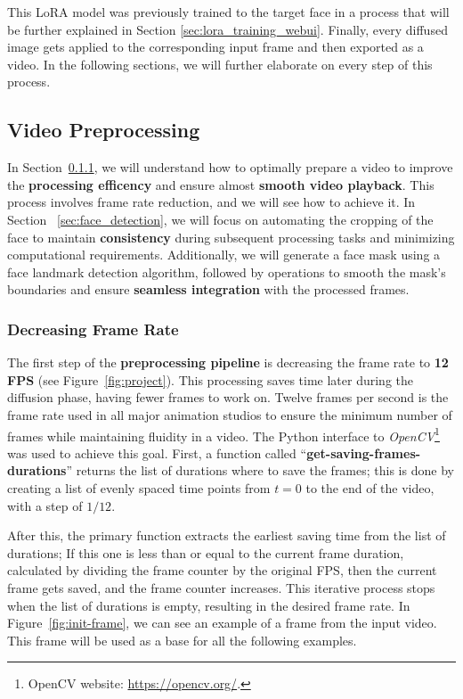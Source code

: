 \documentclass[preprint]{elsarticle}
\begin{document}
This LoRA model was previously trained to the target face in a process that will be further explained in Section \ref{sec:lora_training_webui}.  Finally, every diffused image gets applied to the corresponding input frame and then exported as a video. In the following sections, we will further elaborate on every step of this process. 



\subsection{Video Preprocessing} \label{sec:video_preprocessing}

In Section~\ref{sec:decreasing_frame_rate}, we will understand how to optimally prepare a video to improve the \textbf{processing efficency} and ensure almost \textbf{smooth video playback}. This process involves frame rate reduction, and we will see how to achieve it.
In Section ~\ref{sec:face_detection}, we will focus on automating the cropping of the face to maintain \textbf{consistency} during subsequent processing tasks and minimizing computational requirements. Additionally, we will generate a face mask using a face landmark detection algorithm, followed by operations to smooth the mask's boundaries and ensure \textbf{seamless integration} with the processed frames.



\subsubsection{Decreasing Frame Rate}\label{sec:decreasing_frame_rate}

The first step of the \textbf{preprocessing pipeline} is decreasing the frame rate to \textbf{12 FPS} (see Figure~\ref{fig:project}). 
This processing saves time later during the diffusion phase, having fewer frames to work on. 
Twelve frames per second is the frame rate used in all major animation studios to ensure the minimum number of  frames while maintaining fluidity in a video. The Python interface to \emph{OpenCV}\footnote{OpenCV website: \url{https://opencv.org/}.} 
was used to achieve this goal.  First, a function called ``\textbf{get-saving-frames-durations}'' returns the list of durations where to save the frames; this is done by creating a list of evenly spaced time points from $t=0$ to the end of the video, with a step of $1/12$. 

After this, the primary function extracts the earliest saving time from the list of durations; 
If this one is less than or equal to the current frame duration, calculated by dividing the frame counter by the original FPS,  then the current frame gets saved, and the frame counter increases. This iterative process stops when the list of durations is empty, resulting in the desired frame rate. In Figure~\ref{fig:init-frame}, we can see an example of a frame from the input video. This frame will be used as a base for all the following examples.
\end{document}
